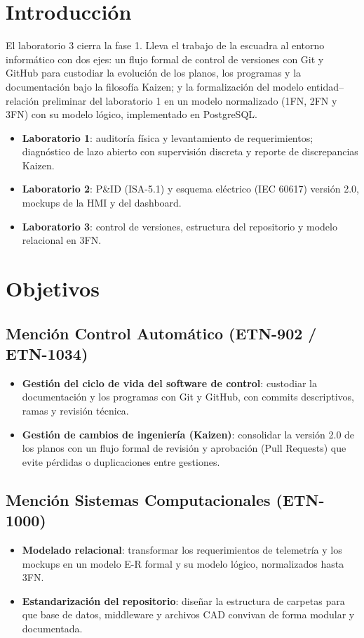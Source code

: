 \documentclass[a4paper,11pt]{article}
\begin{document}

\tableofcontents
\newpage

\section{Introducción}
El laboratorio 3 cierra la fase 1. Lleva el trabajo de la escuadra al entorno informático con dos ejes: un flujo formal de control de versiones con Git y GitHub para custodiar la evolución de los planos, los programas y la documentación bajo la filosofía Kaizen; y la formalización del modelo entidad--relación preliminar del laboratorio 1 en un modelo normalizado (1FN, 2FN y 3FN) con su modelo lógico, implementado en PostgreSQL.

\begin{itemize}
\item \textbf{Laboratorio 1}: auditoría física y levantamiento de requerimientos; diagnóstico de lazo abierto con supervisión discreta y reporte de discrepancias Kaizen.
\item \textbf{Laboratorio 2}: P\&ID (ISA-5.1) y esquema eléctrico (IEC 60617) versión 2.0, mockups de la HMI y del dashboard.
\item \textbf{Laboratorio 3}: control de versiones, estructura del repositorio y modelo relacional en 3FN.
\end{itemize}

\section{Objetivos}
\subsection{Mención Control Automático (ETN-902 / ETN-1034)}
\begin{itemize}
\item \textbf{Gestión del ciclo de vida del software de control}: custodiar la documentación y los programas con Git y GitHub, con commits descriptivos, ramas y revisión técnica.
\item \textbf{Gestión de cambios de ingeniería (Kaizen)}: consolidar la versión 2.0 de los planos con un flujo formal de revisión y aprobación (Pull Requests) que evite pérdidas o duplicaciones entre gestiones.
\end{itemize}
\subsection{Mención Sistemas Computacionales (ETN-1000)}
\begin{itemize}
\item \textbf{Modelado relacional}: transformar los requerimientos de telemetría y los mockups en un modelo E-R formal y su modelo lógico, normalizados hasta 3FN.
\item \textbf{Estandarización del repositorio}: diseñar la estructura de carpetas para que base de datos, middleware y archivos CAD convivan de forma modular y documentada.
\end{itemize}
\end{document}
